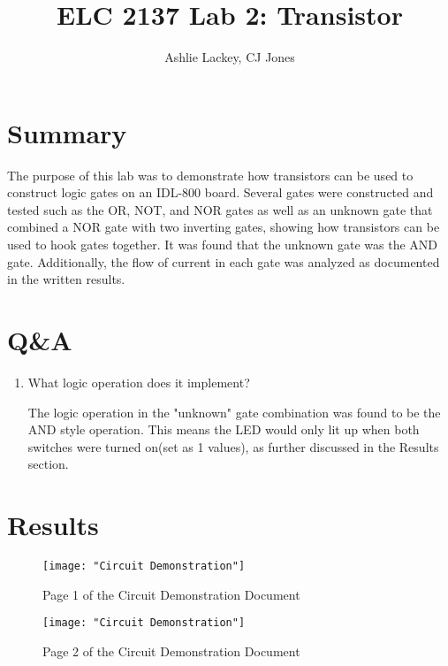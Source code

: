 \documentclass[11pt]{article}
\begin{document}
\title{ELC 2137 Lab 2: Transistor}
\author{Ashlie Lackey, CJ Jones}

\maketitle


\section*{Summary}

The purpose of this lab was to demonstrate how transistors can be used to construct logic gates on an IDL-800 board. Several gates were constructed and tested such as the OR, NOT, and NOR gates as well as an unknown gate that combined a NOR gate with two inverting gates, showing how transistors can be used to hook gates together. It was found that the unknown gate was the AND gate. Additionally, the flow of current in each gate was analyzed as documented in the written results.


\section*{Q\&A}

\begin{enumerate}
	\item What logic operation does it implement?
	
	The logic operation in the "unknown" gate combination was found to be the AND style operation. This means the LED would only lit up when both switches were turned on(set as 1 values), as further discussed in the Results section.
\end{enumerate}



\section*{Results}

\begin{figure}
	\texttt{[image: "Circuit Demonstration"]}
	\caption{Page 1 of the Circuit Demonstration Document}

	
\end{figure}

\begin{figure}
\texttt{[image: "Circuit Demonstration"]}
\caption{Page 2 of the Circuit Demonstration Document}
\end{figure}
\end{document}
